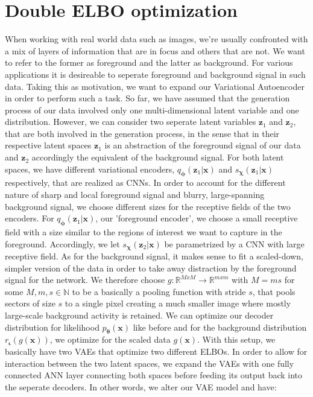 \documentclass[12pt]{report}
\theoremstyle{definition}
\begin{document}
\section{Double ELBO optimization}
When working with real world data such as images, we're usually confronted with a mix of layers of information that are in focus and others that are not. We want to refer to the former as foreground and the latter as background. For various applications it is desireable to seperate foreground and background signal in such data. Taking this as motivation, we want to expand our Variational Autoencoder in order to perform such a task. 
So far, we have assumed that the generation process of our data involved only one multi-dimensional latent variable and one distribution. However, we can consider two seperate latent variables $\mathbf{z}_1$ and $\mathbf{z}_2$, that are both involved in the generation process, in the sense that in their respective latent spaces $\mathbf{z}_1$ is an abstraction of the foreground signal of our data and $\mathbf{z}_2$ accordingly the equivalent of the background signal. For both latent spaces, we have different variational encoders, $q_{\mathbf{\phi}}(\mathbf{z}_1|\mathbf{x})$ and $s_{\mathbf{\chi}}(\mathbf{z}_1|\mathbf{x})$ respectively, that are realized as CNNs. In order to account for the different nature of sharp and local foreground signal and blurry, large-spanning background signal, we choose different sizes for the receptive fields of the two encoders. For $q_{\mathbf{\phi}}(\mathbf{z}_1|\mathbf{x})$, our 'foreground encoder', we choose a small receptive field with a size similar to the regions of interest we want to capture in the foreground. Accordingly, we let $s_{\mathbf{\chi}}(\mathbf{z}_2|\mathbf{x})$ be parametrized by a CNN with large receptive field.
As for the background signal, it makes sense to fit a scaled-down, simpler version of the data in order to take away distraction by the foreground signal for the network. We therefore choose $g: \mathbb{R}^{MxM} \rightarrow \mathbb{R}^{mxm}$ with $M=ms$ for some $M, m, s \in \mathbb{N}$ to be a basically a pooling function with stride $s$, that pools sectors of size $s$ to a single pixel creating a much smaller image where mostly large-scale background activity is retained. We can optimize our decoder distribution for likelihood $p_{\mathbf{\theta}}(\mathbf{x})$ like before and for the background distribution $r_{\mathbf{\iota}}(g(\mathbf{x}))$, we optimize for the scaled data $g(\mathbf{x})$. With this setup, we basically have two VAEs that optimize two different ELBOs. In order to allow for interaction between the two latent spaces, we expand the VAEs with one fully connected ANN layer connecting both spaces before feeding its output back into the seperate decoders. In other words, we alter our VAE model and have:
\end{document}
